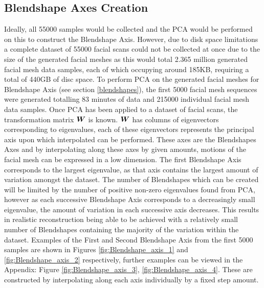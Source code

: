 \subsection{Blendshape Axes Creation}
Ideally, all 55000 samples would be collected and the PCA would be performed on this to construct the Blendshape Axis.
However, due to disk space limitations a complete dataset of 55000 facial scans could not be collected at once due to the size of the generated facial meshes as this would total 2.365 million generated facial mesh data samples, each of which occupying around 185KB, requiring a total of 440GB of disc space.
To perform PCA on the generated facial meshes for Blendshape Axis (see section \ref{blendshapes}), the first 5000 facial mesh sequences were generated totalling 83 minutes of data and 215000 individual facial mesh data samples. 
Once PCA has been applied to a dataset of facial scans, the transformation matrix ${\boldsymbol{{W}}}$ is known.
${\boldsymbol{{W}}}$ has columns of eigenvectors corresponding to eigenvalues, each of these eigenvectors represents the principal axis upon which interpolated can be performed.
These axes are the Blendshapes Axes and by interpolating along these axes by given amounts, motions of the facial mesh can be expressed in a low dimension.
The first Blendshape Axis corresponds to the largest eigenvalue, as that axis contains the largest amount of variation amongst the dataset.
The number of Blendshapes which can be created will be limited by the number of positive non-zero eigenvalues found from PCA, however as each successive Blendshape Axis corresponds to a decreasingly small eigenvalue, the amount of variation in each successive axis decreases. 
This results in realistic reconstruction being able to be achieved with a relatively small number of Blendshapes containing the majority of the variation within the dataset.
Examples of the First and Second Blendshape Axis from the first 5000 samples are shown in Figures \ref{fig:Blendshape_axis_1} and \ref{fig:Blendshape_axis_2} respectively, further examples can be viewed in the Appendix: Figure \ref{fig:Blendshape_axis_3}, \ref{fig:Blendshape_axis_4}.
These are constructed by interpolating along each axis individually by a fixed step amount.

